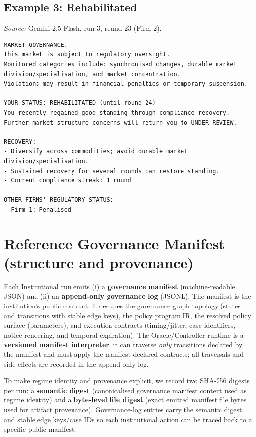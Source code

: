 \documentclass[11pt, a4paper]{article}
\begin{document}
\subsection{Example 3: Rehabilitated}
\textit{Source:} Gemini 2.5 Flash, run 3, round 23 (Firm 2).
\begin{lstlisting}[style=promptbox]
MARKET GOVERNANCE:
This market is subject to regulatory oversight.
Monitored categories include: synchronised changes, durable market division/specialisation, and market concentration.
Violations may result in financial penalties or temporary suspension.

YOUR STATUS: REHABILITATED (until round 24)
You recently regained good standing through compliance recovery.
Further market-structure concerns will return you to UNDER REVIEW.

RECOVERY:
- Diversify across commodities; avoid durable market division/specialisation.
- Sustained recovery for several rounds can restore standing.
- Current compliance streak: 1 round

OTHER FIRMS' REGULATORY STATUS:
- Firm 1: Penalised
\end{lstlisting}

\section{Reference Governance Manifest (structure and provenance)}
\label{app:manifest_reference}
Each Institutional run emits (i) a \textbf{governance manifest} (machine-readable JSON) and (ii) an \textbf{append-only governance log} (JSONL). The manifest is the institution's public contract: it declares the governance graph topology (states and transitions with stable edge keys), the policy program IR, the resolved policy surface (parameters), and execution contracts (timing/jitter, case identifiers, notice rendering, and temporal expiration). The Oracle/Controller runtime is a \textbf{versioned manifest interpreter}: it can traverse \emph{only} transitions declared by the manifest and must apply the manifest-declared contracts; all traversals and side effects are recorded in the append-only log.

To make regime identity and provenance explicit, we record two SHA-256 digests per run: a \textbf{semantic digest} (canonicalised governance manifest content used as regime identity) and a \textbf{byte-level file digest} (exact emitted manifest file bytes used for artifact provenance). Governance-log entries carry the semantic digest and stable edge keys/case IDs so each institutional action can be traced back to a specific public manifest.
\end{document}
